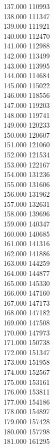 { 137.000	110993 \\
 138.000	111347 \\
 139.000	111921 \\
 140.000	112470 \\
 141.000	112988 \\
 142.000	113499 \\
 143.000	113995 \\
 144.000	114684 \\
 145.000	115022 \\
 146.000	118556 \\
 147.000	119203 \\
 148.000	119741 \\
 149.000	120233 \\
 150.000	120607 \\
 151.000	121060 \\
 152.000	121534 \\
 153.000	122167 \\
 154.000	131236 \\
 155.000	131606 \\
 156.000	131962 \\
 157.000	132631 \\
 158.000	139696 \\
 159.000	140347 \\
 160.000	140685 \\
 161.000	141316 \\
 162.000	141886 \\
 163.000	144259 \\
 164.000	144877 \\
 165.000	145330 \\
 166.000	147160 \\
 167.000	147173 \\
 168.000	147182 \\
 169.000	147508 \\
 170.000	147973 \\
 171.000	150738 \\
 172.000	151347 \\
 173.000	151958 \\
 174.000	152567 \\
 175.000	153161 \\
 176.000	153811 \\
 177.000	154186 \\
 178.000	154897 \\
 179.000	157428 \\
 180.000	157798 \\
 181.000	161295 \\
}
